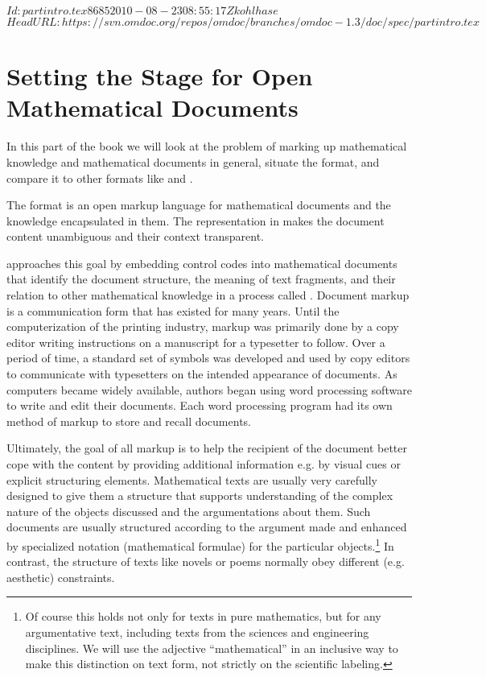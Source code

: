 \svnInfo $Id: partintro.tex 8685 2010-08-23 08:55:17Z kohlhase $
\svnKeyword $HeadURL: https://svn.omdoc.org/repos/omdoc/branches/omdoc-1.3/doc/spec/partintro.tex $

\part{Setting the Stage for Open Mathematical Documents}\label{part:markup}

  In this part of the book we will look at the problem of marking up mathematical
  knowledge and mathematical documents in general, situate the {\omdoc} format, and
  compare it to other formats like {\openmath} and {\mathml}.

  The {\omdoc} format is an open markup language for mathematical documents and the
  knowledge encapsulated in them. The representation in
  {\omdoc} makes the document content unambiguous and their context transparent.

  {\omdoc} approaches this goal by embedding control codes into mathematical documents that
  identify the document structure, the meaning of text fragments, and their relation to
  other mathematical knowledge in a process called {}.
  Document markup is a communication form that has existed for many years. Until the
  computerization of the printing industry, markup was primarily done by a copy editor
  writing instructions on a manuscript for a typesetter to follow. Over a period of time,
  a standard set of symbols was developed and used by copy editors to communicate with
  typesetters on the intended appearance of documents. As computers became widely
  available, authors began using word processing software to write and edit their
  documents.  Each word processing program had its own method of markup to store and
  recall documents.

  Ultimately, the goal of all markup is to help the recipient of the document better cope
  with the content by providing additional information e.g. by visual cues or explicit
  structuring elements. Mathematical texts are usually very carefully designed to give
  them a structure that supports understanding of the complex nature of the objects
  discussed and the argumentations about them.  Such documents are usually structured
  according to the argument made and enhanced by specialized notation (mathematical
  formulae) for the particular objects.\footnote{Of course this holds not only for texts
    in pure mathematics, but for any argumentative text, including texts from the sciences
    and engineering disciplines.  We will use the adjective ``mathematical'' in an
    inclusive way to make this distinction on text form, not strictly on the scientific
    labeling.}  In contrast, the structure of texts like novels or poems normally obey
  different (e.g. aesthetic) constraints.

